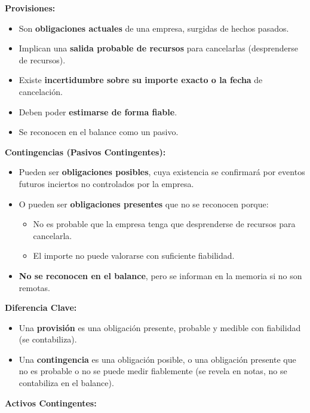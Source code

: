 \documentclass[
  paper=a4,
  ,captions=tableheading
]{scrbook}
\providecommand{\tightlist}{%
  \setlength{\itemsep}{0pt}\setlength{\parskip}{0pt}}
\begin{document}
\textbf{Provisiones:}

\begin{itemize}
\tightlist
\item
  Son \textbf{obligaciones actuales} de una empresa, surgidas de hechos
  pasados.
\item
  Implican una \textbf{salida probable de recursos} para cancelarlas
  (desprenderse de recursos).
\item
  Existe \textbf{incertidumbre sobre su importe exacto o la fecha} de
  cancelación.
\item
  Deben poder \textbf{estimarse de forma fiable}.
\item
  Se reconocen en el balance como un pasivo.
\end{itemize}

\textbf{Contingencias (Pasivos Contingentes):}

\begin{itemize}
\tightlist
\item
  Pueden ser \textbf{obligaciones posibles}, cuya existencia se
  confirmará por eventos futuros inciertos no controlados por la
  empresa.
\item
  O pueden ser \textbf{obligaciones presentes} que no se reconocen
  porque:

  \begin{itemize}
  \tightlist
  \item
    No es probable que la empresa tenga que desprenderse de recursos
    para cancelarla.
  \item
    El importe no puede valorarse con suficiente fiabilidad.
  \end{itemize}
\item
  \textbf{No se reconocen en el balance}, pero se informan en la memoria
  si no son remotas.
\end{itemize}

\textbf{Diferencia Clave:}

\begin{itemize}
\tightlist
\item
  Una \textbf{provisión} es una obligación presente, probable y medible
  con fiabilidad (se contabiliza).
\item
  Una \textbf{contingencia} es una obligación posible, o una obligación
  presente que no es probable o no se puede medir fiablemente (se revela
  en notas, no se contabiliza en el balance).
\end{itemize}

\textbf{Activos Contingentes:}
\end{document}
